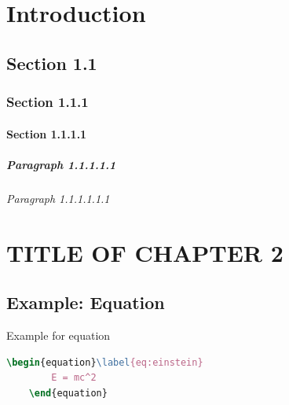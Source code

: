 \documentclass[11pt]{report}
\begin{document}
{
\tableofcontents
\listoffigures
\listoftables
}

\newpage

\chapter{Introduction}\label{c:chp1}

\lipsum[1]

\section{Section 1.1}

\subsection{Section 1.1.1}

\subsubsection{Section 1.1.1.1}

\paragraph{Paragraph 1.1.1.1.1}

\subparagraph{Paragraph 1.1.1.1.1.1}

\chapter{TITLE OF CHAPTER 2}\label{c:chp2}


\section{Example: Equation}

Example for equation

\begin{lstlisting}[language=TeX]
    \begin{equation}\label{eq:einstein}
        E = mc^2
    \end{equation}
\end{lstlisting}
\end{document}
